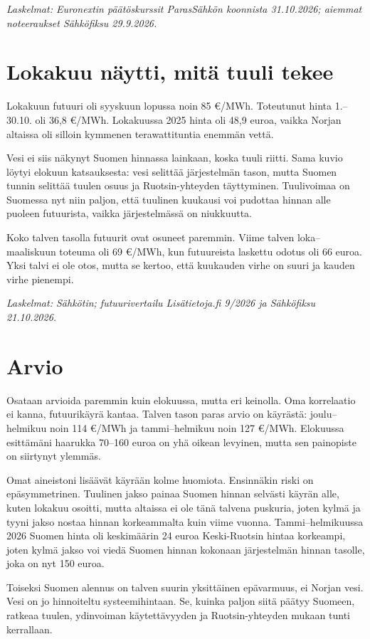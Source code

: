 \documentclass[11pt,a4paper]{article}
\newcommand{\laskelmat}[1]{{\sffamily\small\itshape\color{meri}Laskelmat: #1}}
\begin{document}
\laskelmat{Euronextin päätöskurssit ParasSähkön koonnista 31.10.2026; aiemmat noteeraukset Sähköfiksu 29.9.2026.}

\section{Lokakuu näytti, mitä tuuli tekee}

Lokakuun futuuri oli syyskuun lopussa noin 85 €/MWh. Toteutunut hinta 1.–30.10. oli 36,8 €/MWh. Lokakuussa 2025 hinta oli 48,9 euroa, vaikka Norjan altaissa oli silloin kymmenen terawattituntia enemmän vettä.

Vesi ei siis näkynyt Suomen hinnassa lainkaan, koska tuuli riitti. Sama kuvio löytyi elokuun katsauksesta: vesi selittää järjestelmän tason, mutta Suomen tunnin selittää tuulen osuus ja Ruotsin-yhteyden täyttyminen. Tuulivoimaa on Suomessa nyt niin paljon, että tuulinen kuukausi voi pudottaa hinnan alle puoleen futuurista, vaikka järjestelmässä on niukkuutta.

Koko talven tasolla futuurit ovat osuneet paremmin. Viime talven loka–maaliskuun toteuma oli 69 €/MWh, kun futuureista laskettu odotus oli 66 euroa. Yksi talvi ei ole otos, mutta se kertoo, että kuukauden virhe on suuri ja kauden virhe pienempi.

\laskelmat{Sähkötin; futuurivertailu Lisätietoja.fi 9/2026 ja Sähköfiksu 21.10.2026.}

\section{Arvio}

Osataan arvioida paremmin kuin elokuussa, mutta eri keinolla. Oma korrelaatio ei kanna, futuurikäyrä kantaa. Talven tason paras arvio on käyrästä: joulu–helmikuu noin 114 €/MWh ja tammi–helmikuu noin 127 €/MWh. Elokuussa esittämäni haarukka 70–160 euroa on yhä oikean levyinen, mutta sen painopiste on siirtynyt ylemmäs.

Omat aineistoni lisäävät käyrään kolme huomiota. Ensinnäkin riski on epäsymmetrinen. Tuulinen jakso painaa Suomen hinnan selvästi käyrän alle, kuten lokakuu osoitti, mutta altaissa ei ole tänä talvena puskuria, joten kylmä ja tyyni jakso nostaa hinnan korkeammalta kuin viime vuonna. Tammi–helmikuussa 2026 Suomen hinta oli keskimäärin 24 euroa Keski-Ruotsin hintaa korkeampi, joten kylmä jakso voi viedä Suomen hinnan kokonaan järjestelmän hinnan tasolle, joka on nyt 150 euroa.

Toiseksi Suomen alennus on talven suurin yksittäinen epävarmuus, ei Norjan vesi. Vesi on jo hinnoiteltu systeemihintaan. Se, kuinka paljon siitä päätyy Suomeen, ratkeaa tuulen, ydinvoiman käytettävyyden ja Ruotsin-yhteyden mukaan tunti kerrallaan.
\end{document}
